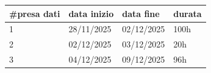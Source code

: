 \begin{tabular}{llll}
\hline
\#presa dati & data inizio & data fine  & durata \\ \hline
1            & 28/11/2025  & 02/12/2025 & 100h   \\
2            & 02/12/2025  & 03/12/2025 & 20h    \\
3            & 04/12/2025  & 09/12/2025 & 96h    \\ \hline
\end{tabular}
